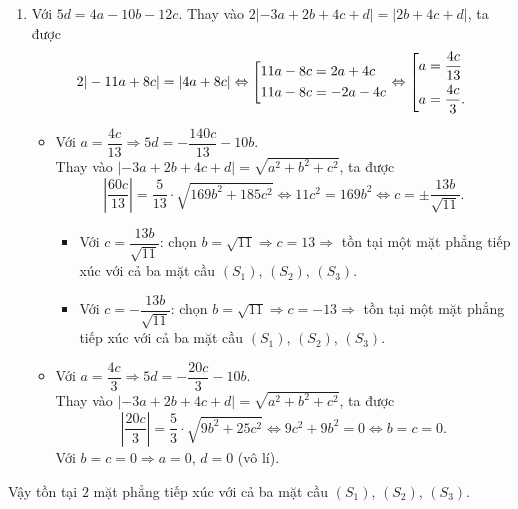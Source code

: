 \begin{ex}
{\begin{enumerate}
\begin{itemize}
\begin{align*}
\Leftrightarrow&\left|\dfrac{2c}{5} \right|=\dfrac{1}{5}\cdot\sqrt{25b^{2}+61c^{2}}\Leftrightarrow 4c^{2}=25b^{2}+61c^{2}\Leftrightarrow b=c=0.
\end{align*}
Với $ b=c=0\Rightarrow a=0 $, $ d=0 $ (vô lí).
\item Với $ a=-\dfrac{4c}{3}\Rightarrow d=-\dfrac{20c}{3}-2b $.\\
Thay vào $ |-3a+2b+4c+d|=\sqrt{a^{2}+b^{2}+c^{2}} $, ta được
\begin{align*}
&\left| \dfrac{12c}{5}+2b+4c-\dfrac{20c}{5}-2b\right|=\sqrt{\left(-\dfrac{4c}{3} \right)^{2}+b^{2}+c^{2}}\\
\Leftrightarrow&\left|\dfrac{4c}{3} \right|=\dfrac{1}{3}\cdot\sqrt{9b^{2}+25c^{2}}\Leftrightarrow 16c^{2}=9b^{2}+25c^{2}\Leftrightarrow b=c=0.
\end{align*}
Với $ b=c=0\Rightarrow a=0 $, $ d=0 $ (vô lí).
\end{itemize}
\item Với $ 5d=4a-10b-12c $. Thay vào $ 2|-3a+2b+4c+d|=|2b+4c+d| $, ta được
\[ 
2|-11a+8c|=|4a+8c|\Leftrightarrow\left[\begin{aligned}&11a-8c=2a+4c\\ &11a-8c=-2a-4c\end{aligned}\right.\Leftrightarrow\left[\begin{aligned}&a=\dfrac{4c}{13}\\ &a=\dfrac{4c}{3}.\end{aligned}\right.
\]
\begin{itemize}
	\item Với $ a=\dfrac{4c}{13}\Rightarrow 5d=-\dfrac{140c}{13}-10b $.\\
	Thay vào $ |-3a+2b+4c+d|=\sqrt{a^{2}+b^{2}+c^{2}} $, ta được
	\[ 
	\left| \dfrac{60c}{13}\right|=\dfrac{5}{13}\cdot\sqrt{169b^{2}+185c^{2}}	\Leftrightarrow 11c^{2}=169b^{2}\Leftrightarrow c=\pm\dfrac{13b}{\sqrt{11}}.
	\]
	\begin{itemize}
		\item Với $ c=\dfrac{13b}{\sqrt{11}} $: chọn $ b=\sqrt{11}\Rightarrow c=13\Rightarrow $ tồn tại một mặt phẳng tiếp xúc với cả ba mặt cầu $ (S_{1}) $, $ (S_{2}) $, $ (S_{3}) $.
		\item Với $ c=-\dfrac{13b}{\sqrt{11}} $: chọn $ b=\sqrt{11}\Rightarrow c=-13\Rightarrow $ tồn tại một mặt phẳng tiếp xúc với cả ba mặt cầu $ (S_{1}) $, $ (S_{2}) $, $ (S_{3}) $.
	\end{itemize}
	\item Với $ a=\dfrac{4c}{3}\Rightarrow 5d=-\dfrac{20c}{3}-10b $.\\
	Thay vào $ |-3a+2b+4c+d|=\sqrt{a^{2}+b^{2}+c^{2}} $, ta được
	\[ 
	\left| \dfrac{20c}{3}\right|=\dfrac{5}{3}\cdot\sqrt{9b^{2}+25c^{2}}	\Leftrightarrow 9c^{2}+9b^{2}=0\Leftrightarrow b=c=0.
	\]
	Với $ b=c=0\Rightarrow a=0 $, $ d=0 $ (vô lí).
\end{itemize}
\end{enumerate}
Vậy tồn tại $ 2 $ mặt phẳng tiếp xúc với cả ba mặt cầu $ (S_{1}) $, $ (S_{2}) $, $ (S_{3}) $.
}
\end{ex}
